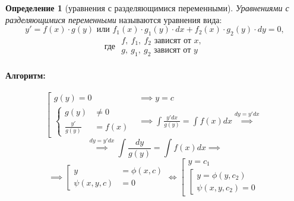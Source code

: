 \documentclass[11pt,a4paper,oneside]{report}
\theoremstyle{definition}
\newtheorem{definition}{Определение}[section]
\theoremstyle{plain}
\theoremstyle{remark}
\begin{document}
\begin{definition}[уравнения с разделяющимися переменными]
    \emph{Уравнениями с разделяющимися переменными} называются уравнения вида:
    \begin{equation*}
        y'=f(x)\cdot g(y)\text{ или }f_1(x) \cdot g_1(y)\cdot dx + f_2(x) \cdot g_2(y)\cdot dy = 0,
    \end{equation*}
    \begin{equation*}
        \text{где }\begin{array}{l}
            f, \ f_1, \ f_2\text{ зависят от }x, \\
            g, \ g_1, \ g_2\text{ зависят от }y
        \end{array}
    \end{equation*}

    \paragraph*{Алгоритм:}

    \begin{equation*}
        \left[\begin{array}{rl}
            g(y) = 0 & \implies y = c                                                            \\
            \left\{
            \begin{array}{rl}
                g(y)            & \ne 0  \\
                \frac{y'}{g(y)} & = f(x)
            \end{array}
            \right.  & \implies \int \frac{y'dx}{g(y)} = \int f(x)dx \overset{dy=y'dx}{\implies}
        \end{array}\right.
    \end{equation*}
    \begin{equation*}
        \overset{dy=y'dx}{\implies}\int \frac{dy}{g(y)} = \int f(x)dx \implies
    \end{equation*}
    \begin{equation*}
        \implies\left[ \begin{array}{rl}
            y            & = \phi(x,c) \\
            \psi (x,y,c) & = 0
        \end{array}\right. \iff \left[\begin{array}{l}
            y = c_1 \\
            \left[\begin{array}{l}
                      y = \phi(y,c_2) \\
                      \psi(x,y,c_2) = 0
                  \end{array}
            \right.
        \end{array}\right.
    \end{equation*}
\end{definition}
\end{document}
